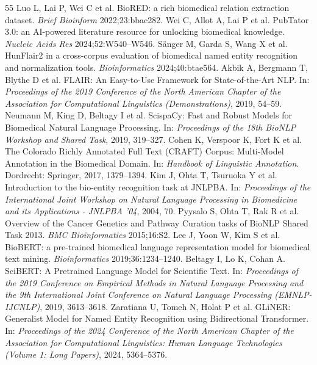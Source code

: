 \documentclass[11pt,a4paper]{article}
\begin{document}
\begin{thebibliography}{55}
Luo L, Lai P, Wei C et al. BioRED: a rich biomedical relation extraction dataset. \emph{Brief Bioinform} 2022;23:bbac282.
Wei C, Allot A, Lai P et al. PubTator 3.0: an AI-powered literature resource for unlocking biomedical knowledge. \emph{Nucleic Acids Res} 2024;52:W540–W546.
Sänger M, Garda S, Wang X et al. HunFlair2 in a cross-corpus evaluation of biomedical named entity recognition and normalization tools. \emph{Bioinformatics} 2024;40:btae564.
Akbik A, Bergmann T, Blythe D et al. FLAIR: An Easy-to-Use Framework for State-of-the-Art NLP. In: \emph{Proceedings of the 2019 Conference of the North American Chapter of the Association for Computational Linguistics (Demonstrations)}, 2019, 54–59.
Neumann M, King D, Beltagy I et al. ScispaCy: Fast and Robust Models for Biomedical Natural Language Processing. In: \emph{Proceedings of the 18th BioNLP Workshop and Shared Task}, 2019, 319–327.
Cohen K, Verspoor K, Fort K et al. The Colorado Richly Annotated Full Text (CRAFT) Corpus: Multi-Model Annotation in the Biomedical Domain. In: \emph{Handbook of Linguistic Annotation}. Dordrecht: Springer, 2017, 1379–1394.
Kim J, Ohta T, Tsuruoka Y et al. Introduction to the bio-entity recognition task at JNLPBA. In: \emph{Proceedings of the International Joint Workshop on Natural Language Processing in Biomedicine and its Applications - JNLPBA '04}, 2004, 70.
Pyysalo S, Ohta T, Rak R et al. Overview of the Cancer Genetics and Pathway Curation tasks of BioNLP Shared Task 2013. \emph{BMC Bioinformatics} 2015;16:S2.
Lee J, Yoon W, Kim S et al. BioBERT: a pre-trained biomedical language representation model for biomedical text mining. \emph{Bioinformatics} 2019;36:1234–1240.
Beltagy I, Lo K, Cohan A. SciBERT: A Pretrained Language Model for Scientific Text. In: \emph{Proceedings of the 2019 Conference on Empirical Methods in Natural Language Processing and the 9th International Joint Conference on Natural Language Processing (EMNLP-IJCNLP)}, 2019, 3613–3618.
Zaratiana U, Tomeh N, Holat P et al. GLiNER: Generalist Model for Named Entity Recognition using Bidirectional Transformer. In: \emph{Proceedings of the 2024 Conference of the North American Chapter of the Association for Computational Linguistics: Human Language Technologies (Volume 1: Long Papers)}, 2024, 5364–5376.

\end{thebibliography}
\end{document}
